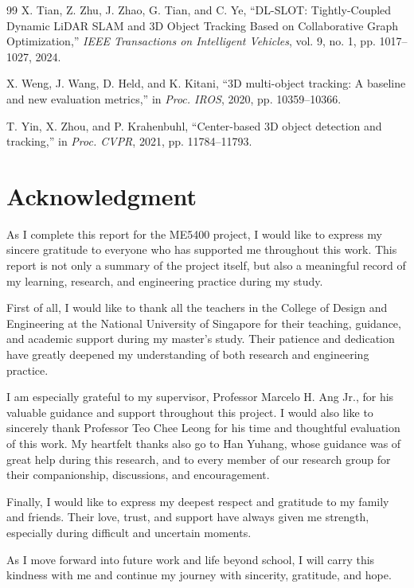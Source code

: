 \documentclass[a4paper,12pt]{article}
\begin{document}
\begin{thebibliography}{99}
X. Tian, Z. Zhu, J. Zhao, G. Tian, and C. Ye, ``DL-SLOT: Tightly-Coupled Dynamic LiDAR SLAM and 3D Object Tracking Based on Collaborative Graph Optimization,'' \emph{IEEE Transactions on Intelligent Vehicles}, vol. 9, no. 1, pp. 1017--1027, 2024.

X. Weng, J. Wang, D. Held, and K. Kitani, ``3D multi-object tracking: A baseline and new evaluation metrics,'' in \emph{Proc. IROS}, 2020, pp. 10359--10366.

T. Yin, X. Zhou, and P. Krahenbuhl, ``Center-based 3D object detection and tracking,'' in \emph{Proc. CVPR}, 2021, pp. 11784--11793.

\end{thebibliography}

\clearpage
\section*{Acknowledgment}
As I complete this report for the ME5400 project, I would like to express my sincere gratitude to everyone who has supported me throughout this work. This report is not only a summary of the project itself, but also a meaningful record of my learning, research, and engineering practice during my study.

First of all, I would like to thank all the teachers in the College of Design and Engineering at the National University of Singapore for their teaching, guidance, and academic support during my master's study. Their patience and dedication have greatly deepened my understanding of both research and engineering practice.

I am especially grateful to my supervisor, Professor Marcelo H. Ang Jr., for his valuable guidance and support throughout this project. I would also like to sincerely thank Professor Teo Chee Leong for his time and thoughtful evaluation of this work. My heartfelt thanks also go to Han Yuhang, whose guidance was of great help during this research, and to every member of our research group for their companionship, discussions, and encouragement.

Finally, I would like to express my deepest respect and gratitude to my family and friends. Their love, trust, and support have always given me strength, especially during difficult and uncertain moments.

As I move forward into future work and life beyond school, I will carry this kindness with me and continue my journey with sincerity, gratitude, and hope.
\end{document}
